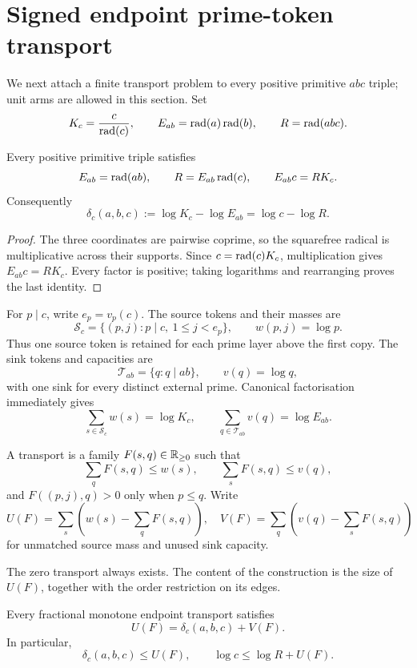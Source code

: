 \section{Signed endpoint prime-token transport}\label{sec:endpoint-prime-token-transport}

We next attach a finite transport problem to every positive primitive $abc$
triple; unit arms are allowed in this section.  Set
\[
 K_c=\frac{c}{\operatorname{rad}(c)},\qquad
 E_{ab}=\operatorname{rad}(a)\operatorname{rad}(b),\qquad R=\operatorname{rad}(abc).
\]

\begin{proposition}\label{prop:endpoint-core-balance}
Every positive primitive triple satisfies
\[
 E_{ab}=\operatorname{rad}(ab),\qquad R=E_{ab}\operatorname{rad}(c),
 \qquad E_{ab}c=RK_c.
\]
Consequently
\[
 \delta_c(a,b,c):=\log K_c-\log E_{ab}
 =\log c-\log R.
\]
\end{proposition}

\begin{proof}
The three coordinates are pairwise coprime, so the squarefree radical is
multiplicative across their supports.  Since $c=\operatorname{rad}(c)K_c$, multiplication
gives $E_{ab}c=RK_c$.  Every factor is positive; taking logarithms and
rearranging proves the last identity.
\end{proof}

For $p\mid c$, write $e_p=v_p(c)$.  The source tokens and their masses are
\[
 \mathcal S_c=\{(p,j):p\mid c,\ 1\le j<e_p\},
 \qquad w(p,j)=\log p.
\]
Thus one source token is retained for each prime layer above the first copy.
The sink tokens and capacities are
\[
 \mathcal T_{ab}=\{q:q\mid ab\},\qquad v(q)=\log q,
\]
with one sink for every distinct external prime.  Canonical factorisation
immediately gives
\[
 \sum_{s\in\mathcal S_c}w(s)=\log K_c,\qquad
 \sum_{q\in\mathcal T_{ab}}v(q)=\log E_{ab}.
\tag{EPT-1}
\]

\begin{definition}
A transport is a family $F(s,q)\in\mathbb R_{\ge0}$ such that
\[
 \sum_qF(s,q)\le w(s),\qquad
 \sum_sF(s,q)\le v(q),
\]
and $F((p,j),q)>0$ only when $p\le q$.  Write
\[
 U(F)=\sum_s\left(w(s)-\sum_qF(s,q)\right),
 \quad
 V(F)=\sum_q\left(v(q)-\sum_sF(s,q)\right)
\]
for unmatched source mass and unused sink capacity.
\end{definition}

The zero transport always exists.  The content of the construction is the
size of $U(F)$, together with the order restriction on its edges.

\begin{theorem}
\label{thm:endpoint-transport-accounting}
Every fractional monotone endpoint transport satisfies
\[
 U(F)=\delta_c(a,b,c)+V(F).
\]
In particular,
\[
 \delta_c(a,b,c)\le U(F),
 \qquad \log c\le\log R+U(F).
\]
\end{theorem}

